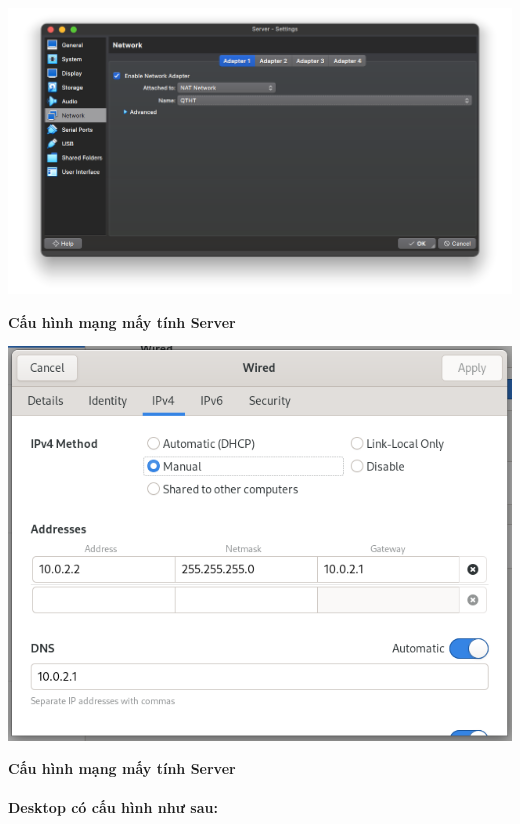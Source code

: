 \begin{minipage}{.93\linewidth}
  \captionsetup{type=figure}
  \includegraphics[width=\linewidth]{./imgs/Hinh-6.png}
  \caption{\bfseries Cấu hình mạng mấy tính Server}
  \label{fig:server-network-1}
\end{minipage}


\begin{minipage}{.93\linewidth}
  \captionsetup{type=figure}
  \includegraphics[width=\linewidth]{./imgs/Hinh-7.png}
  \caption{\bfseries Cấu hình mạng mấy tính Server}
  \label{fig:server-network-2}
\end{minipage}


\paragraph{Desktop có cấu hình như sau:}

